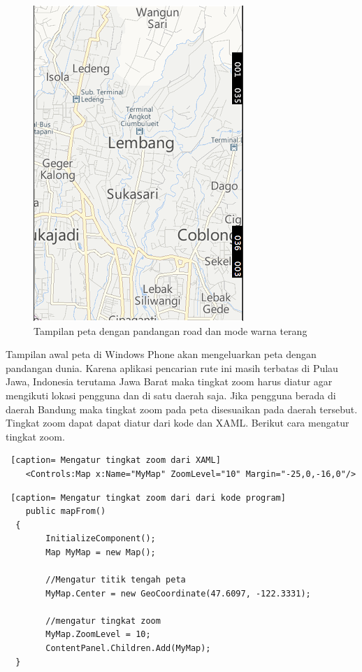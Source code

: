 \begin{figure}[h]
	\centering
		\includegraphics[scale=0.5]{Gambar/road}
	\caption{Tampilan peta dengan pandangan road dan mode warna terang}
	\label{fig:road}
\end{figure}

\hspace{0.5cm} Tampilan awal peta di Windows Phone akan mengeluarkan peta dengan pandangan dunia. Karena aplikasi pencarian rute ini masih terbatas di Pulau Jawa, Indonesia terutama Jawa Barat maka tingkat zoom harus diatur agar mengikuti lokasi pengguna dan di satu daerah saja. Jika pengguna berada di daerah Bandung maka tingkat zoom pada peta disesuaikan pada daerah tersebut. Tingkat zoom dapat dapat diatur dari kode dan XAML. Berikut cara mengatur tingkat zoom.

\begin{lstlisting} [caption= Mengatur tingkat zoom dari XAML]
	<Controls:Map x:Name="MyMap" ZoomLevel="10" Margin="-25,0,-16,0"/>
\end{lstlisting}

\begin{lstlisting} [caption= Mengatur tingkat zoom dari dari kode program]
	public mapFrom()
  {
		InitializeComponent();
		Map MyMap = new Map();

		//Mengatur titik tengah peta
		MyMap.Center = new GeoCoordinate(47.6097, -122.3331);

		//mengatur tingkat zoom
		MyMap.ZoomLevel = 10;
		ContentPanel.Children.Add(MyMap);
  }
\end{lstlisting}

